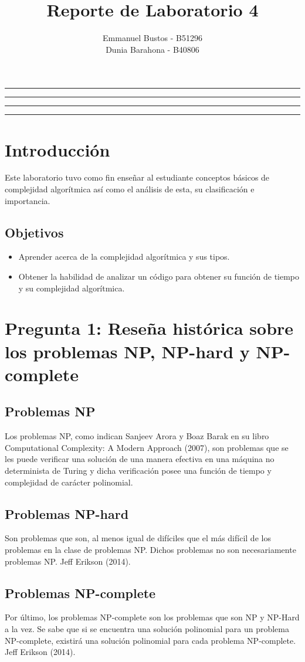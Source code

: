 \documentclass[11pt]{article}
\title{Reporte de Laboratorio 4}
\author{Emmanuel Bustos - B51296 \\ Dunia Barahona - B40806}
\begin{document}
\maketitle
\hrule
\hrule
\tableofcontents
\hspace{5mm}
\hrule
\hrule


\section{Introducción}
Este laboratorio tuvo como fin enseñar al estudiante conceptos básicos de complejidad algorítmica así como el análisis de esta, su clasificación e importancia.
\subsection{Objetivos}
\begin{itemize}
	\item Aprender acerca de la complejidad algorítmica y sus tipos.
	\item Obtener la habilidad de analizar un código para obtener su función de tiempo y su complejidad algorítmica.
\end{itemize}

\section{Pregunta 1: Reseña histórica sobre los problemas NP, NP-hard y NP-complete}
\subsection{Problemas NP}
Los problemas NP, como indican Sanjeev Arora y Boaz Barak en su libro Computational Complexity: A Modern
Approach (2007), son problemas que se les puede verificar una solución de una manera efectiva en una máquina no determinista de Turing y dicha verificación posee una función de tiempo y complejidad de carácter polinomial.
\subsection{Problemas NP-hard}
Son problemas que son, al menos igual de difíciles que el más difícil de los problemas en la clase de problemas NP. Dichos problemas no son necesariamente problemas NP. Jeff Erikson (2014).
\subsection{Problemas NP-complete}
Por último, los problemas NP-complete son los problemas que son NP y NP-Hard a la vez. Se sabe que si se encuentra una solución polinomial para un problema NP-complete, existirá una solución polinomial para cada problema NP-complete. Jeff Erikson (2014).
\end{document}
